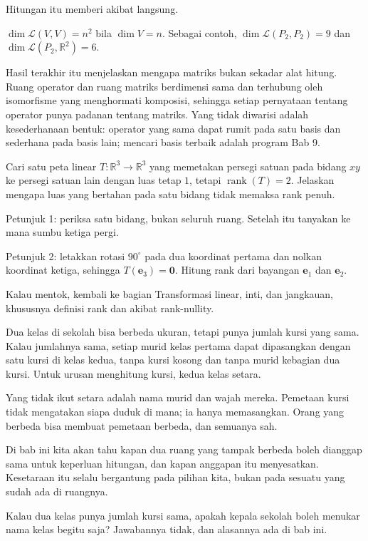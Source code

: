 Hitungan itu memberi akibat langsung.

\begin{akibat}
$\dim\mathcal{L}(V,V)=n^{2}$ bila $\dim V=n$. Sebagai contoh,
$\dim\mathcal{L}(P_{2},P_{2})=9$ dan $\dim\mathcal{L}(P_{2},\mathbb{R}^{2})=6$.
\end{akibat}

Hasil terakhir itu menjelaskan mengapa matriks bukan sekadar alat hitung. Ruang operator
dan ruang matriks berdimensi sama dan terhubung oleh isomorfisme yang menghormati komposisi,
sehingga setiap pernyataan tentang operator punya padanan tentang matriks. Yang tidak
diwarisi
adalah kesederhanaan bentuk: operator yang sama dapat rumit pada satu basis dan sederhana
pada
basis lain; mencari basis terbaik adalah program Bab 9.

\begin{tantangan}
Cari satu peta linear $T\colon\mathbb{R}^{3}\to\mathbb{R}^{3}$ yang memetakan persegi satuan
pada bidang $xy$ ke persegi satuan lain dengan luas tetap $1$, tetapi
$\operatorname{rank}(T)=2$. Jelaskan mengapa luas yang bertahan pada satu bidang tidak
memaksa
rank penuh.

Petunjuk 1: periksa satu bidang, bukan seluruh ruang. Setelah itu tanyakan ke mana sumbu
ketiga
pergi.

Petunjuk 2: letakkan rotasi $90^{\circ}$ pada dua koordinat pertama dan nolkan koordinat
ketiga,
sehingga $T(\mathbf{e}_{3})=\mathbf{0}$. Hitung rank dari bayangan $\mathbf{e}_{1}$ dan
$\mathbf{e}_{2}$.

Kalau mentok, kembali ke bagian Transformasi linear, inti, dan jangkauan, khususnya definisi
rank dan akibat rank-nullity.
\end{tantangan}

\begin{untukanak}
Dua kelas di sekolah bisa berbeda ukuran, tetapi punya jumlah kursi yang sama. Kalau
jumlahnya
sama, setiap murid kelas pertama dapat dipasangkan dengan satu kursi di kelas kedua, tanpa
kursi
kosong dan tanpa murid kebagian dua kursi. Untuk urusan menghitung kursi, kedua kelas
setara.

Yang tidak ikut setara adalah nama murid dan wajah mereka. Pemetaan kursi tidak mengatakan
siapa duduk di mana; ia hanya memasangkan. Orang yang berbeda bisa membuat pemetaan berbeda,
dan semuanya sah.

Di bab ini kita akan tahu kapan dua ruang yang tampak berbeda boleh dianggap sama untuk
keperluan hitungan, dan kapan anggapan itu menyesatkan. Kesetaraan itu selalu bergantung
pada
pilihan kita, bukan pada sesuatu yang sudah ada di ruangnya.

Kalau dua kelas punya jumlah kursi sama, apakah kepala sekolah boleh menukar nama kelas
begitu
saja? Jawabannya tidak, dan alasannya ada di bab ini.
\end{untukanak}

